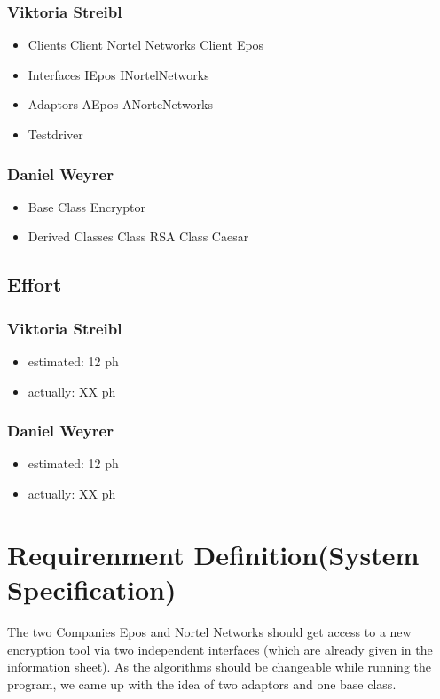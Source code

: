 \subsubsection{Viktoria Streibl}
\begin{itemize}
	\item Clients
	\subitem Client Nortel Networks
	\subitem Client Epos

	\item Interfaces
	\subitem IEpos
	\subitem INortelNetworks

	\item Adaptors
	\subitem AEpos
	\subitem ANorteNetworks
		
	\item Testdriver
	
\end{itemize}

\subsubsection{Daniel Weyrer}
\begin{itemize}
	\item Base Class Encryptor
	\item Derived Classes
		\subitem Class RSA
		\subitem Class Caesar
\end{itemize}

\subsection{Effort}

\subsubsection {Viktoria Streibl}
\begin{itemize}
	\item estimated: 12 ph 
	\item actually: XX ph
\end{itemize}

\subsubsection {Daniel Weyrer}
\begin{itemize}
	\item estimated: 12 ph 
	\item actually: XX ph
\end{itemize}

\section{Requirenment Definition(System Specification)}
The two Companies Epos and Nortel Networks should get access to a new encryption tool via two independent interfaces (which are already given in the information sheet). As the algorithms should be changeable while running the program, we came up with the idea of two adaptors and one base class.

